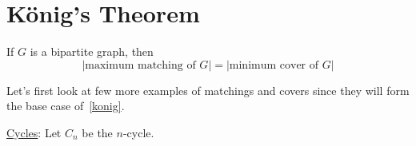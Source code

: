 \section{König's Theorem}
\begin{thmbox}
    \begin{theorem}
        If $ G $ is a bipartite graph, then
        \[ |\text{maximum matching of }G|=|\text{minimum cover of }G| \]
    \end{theorem}
\end{thmbox}
Let's first look at few more examples of matchings and covers since they will form the
base case of~\ref{konig}.

\underline{Cycles}: Let $ C_n $ be the $ n $-cycle.


\begin{figure}[H]
    \centering
    \begin{tikzpicture}[x=0.75pt,y=0.75pt,yscale=-1,xscale=1]


\end{tikzpicture}
\end{figure}
